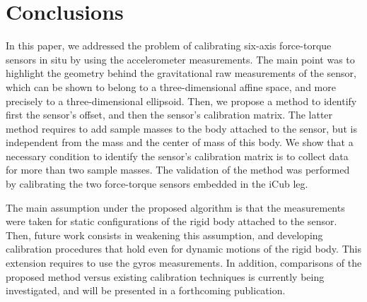 \section{Conclusions}
\label{conclusions}
In this paper, we addressed the problem of calibrating six-axis force-torque sensors in situ by using the accelerometer measurements. 
The main point was to highlight the geometry behind the gravitational
raw measurements of the sensor, which can be shown to belong to a three-dimensional affine space, and more precisely to a three-dimensional ellipsoid.
Then, we propose a method to identify first the sensor's offset, and then the sensor's calibration matrix. The latter method requires to add sample masses
to the body attached to the sensor, but is independent from the mass and the center of mass of this body. We show that a necessary condition to identify the sensor's calibration matrix is to collect data for more than two 
sample masses. The validation of the method was performed by calibrating the two force-torque sensors embedded in the iCub leg.

The main assumption under the proposed algorithm is that the measurements were taken for static configurations of the rigid body attached to the sensor.
Then, future work consists in weakening this assumption, and developing calibration procedures that hold even for dynamic motions of the rigid body. This
extension requires to use the gyros measurements. In addition, comparisons of the proposed method versus existing calibration 
techniques is currently being investigated, and will be presented in a forthcoming publication.